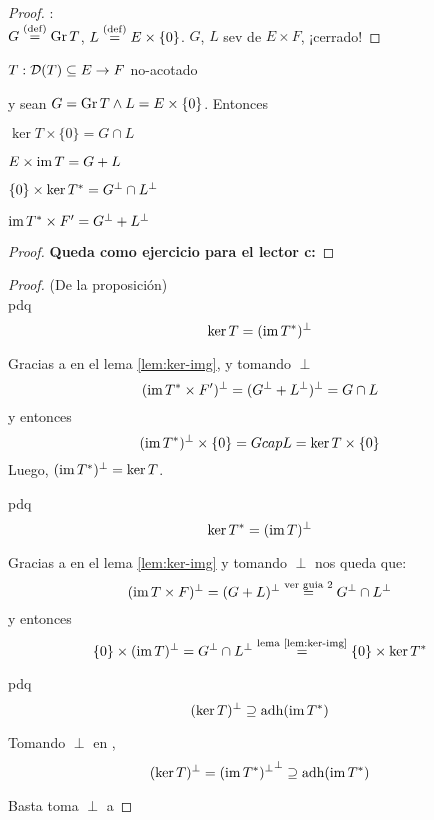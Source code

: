 \begin{proof}:\\
$G \defeq \gr T$, $L \defeq E \times \{ 0 \}$. $G$, $L$ sev de $E \times F$, ¡cerrado!
\end{proof}

\begin{lem}\label{lem:ker-img}
$T: \cd(T) \subseteq E \to F$ no-acotado

y sean $G = \gr T \wedge L = E \times \{ 0 \}$. Entonces

\begin{ienumerate}
\item $
\ker T \times \{ 0 \} = G \cap L
$

\item $
E \times \im T = G + L
$

\item $
\{ 0 \} \times \ker T\adj = G\ort \cap L\ort
$

\item $
\im T\adj \times F' = G\ort + L\ort
$


\end{ienumerate}
\end{lem}

\begin{proof}
\textbf{Queda como ejercicio para el lector c:}
\end{proof}

\begin{proof}(De la proposición) \\

\iitem[i] pdq $$\ker T = (\im T\adj)\ort$$

Gracias a \iitem[iv] en el lema \ref{lem:ker-img}, y tomando $\perp$ $$
(\im T\adj \times F')\ort = (G\ort + L\ort)\ort = G \cap L
$$ y entonces $$
(\im T\adj)\ort \times \{ 0 \} = G cap L = \ker T \times \{ 0 \}
$$ Luego, $(\im T\adj)\ort = \ker T$.

\iitem[ii] pdq $$
\ker T\adj = (\im T )\ort
$$

Gracias a \iitem[ii] en el lema \ref{lem:ker-img} y tomando $\perp$ nos queda que: $$
(\im T \times F)\ort = (G + L)\ort \overset{\text{ver guia 2}}{=} G\ort \cap L\ort
$$ y entonces $$
 \{ 0 \} \times (\im T )\ort = G\ort \cap L\ort \overset{\text{lema \ref{lem:ker-img}}}{=} \{ 0 \} \times \ker T \adj
$$

\iitem[iii] pdq $$
(\ker T)\ort \supseteq \adh( \im T\adj )
$$

Tomando $\perp$ en \iitem[i], $$
(\ker T)\ort = {(\im T\adj)\ort}\ort \supseteq \adh(\im T \adj)
$$

\iitem[iv] Basta toma $\perp$ a \iitem[ii]
\end{proof}

